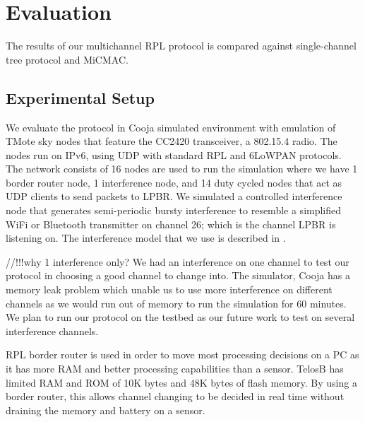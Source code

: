 \section{Evaluation}
The results of our multichannel RPL protocol is compared against single-channel tree protocol and MiCMAC.

\subsection{Experimental Setup}
We evaluate the protocol in Cooja simulated environment with emulation of TMote sky nodes that feature the CC2420 transceiver, a 802.15.4 radio. The nodes run on IPv6, using UDP with standard RPL and 6LoWPAN protocols. The network consists of 16 nodes are used to run the simulation where we have 1 border router node, 1 interference node, and 14 duty cycled nodes that act as UDP clients to send packets to LPBR. We simulated a controlled interference node that generates semi-periodic bursty interference to resemble a simplified WiFi or Bluetooth transmitter on channel 26; which is the channel LPBR is listening on. The interference model that we use is described in \cite{Boano:2010:MSM:2127940.2127963}. 

//!!!why 1 interference only?
We had an interference on one channel to test our protocol in choosing a good channel to change into. The simulator, Cooja has a memory leak problem which unable us to use more interference on different channels as we would run out of memory to run the simulation for 60 minutes. We plan to run our protocol on the testbed as our future work to test on several interference channels.

RPL border router is used in order to move most processing decisions on a PC as it has more RAM and better processing capabilities than a sensor. TelosB has limited RAM and ROM of 10K bytes and 48K bytes of flash memory. By using a border router, this allows channel changing to be decided in real time without draining the memory and battery on a sensor. 



